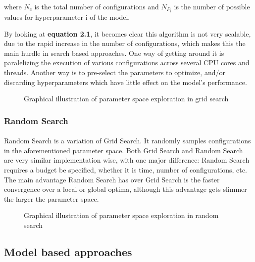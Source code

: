 where $N_c$ is the total number of configurations and $N_{P_i}$ is the number of possible values for hyperparameter i of the model.

By looking at \textbf{equation 2.1}, it becomes clear this algorithm is not very scalable, due to the rapid increase in the number of configurations, which makes this the main hurdle in search based approaches. One way of getting around it is paralelizing the execution of various configurations across several CPU cores and threads. Another way is to pre-select the parameters to optimize, and/or discarding hyperparameters which have little effect on the model's performance.

\begin{figure}[h]
    \centering
    
    \caption{Graphical illustration of parameter space exploration in grid search}
    \label{fig:enter-label}
\end{figure}

\subsubsection{Random Search}
\paragraph{}Random Search is a variation of Grid Search. It randomly samples configurations in the aforementioned parameter space\cite{bissuel2020hyper}. Both Grid Search and Random Search are very similar implementation wise, with one major difference: Random Search requires a budget be specified, whether it is time, number of configurations, etc.\cite{bergstra2012random} The main advantage Random Search has over Grid Search is the faster convergence over a local or global optima\cite{bergstra2012random}, although this advantage gets slimmer the larger the parameter space.

\begin{figure}[h]
    \centering
    
    \caption{Graphical illustration of parameter space exploration in random search}
    \label{fig:enter-label}
\end{figure}

\subsection{Model based approaches}
